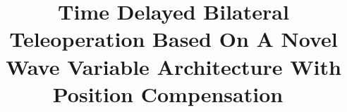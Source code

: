 

% 

% 
\documentclass[conference]{IEEEtran}
\IEEEoverridecommandlockouts
\usepackage{cite}
\usepackage{amsmath,amssymb,amsfonts}
\usepackage{algorithmic}
\usepackage{graphicx}
\usepackage{textcomp}
\usepackage{xcolor}
\usepackage{float}
\usepackage{subfigure}

\def\BibTeX{{\rm B\kern-.05em{\sc i\kern-.025em b}\kern-.08em
    T\kern-.1667em\lower.7ex\hbox{E}\kern-.125emX}}


\title{Time Delayed Bilateral Teleoperation Based On A Novel Wave Variable Architecture With Position Compensation\
}

